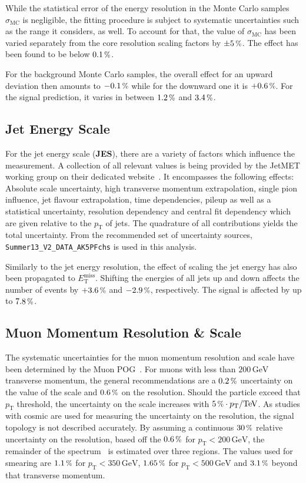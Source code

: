 While the statistical error of the energy resolution in the Monte Carlo samples $\sigma_{\text{MC}}$ is negligible, the fitting procedure is subject to systematic uncertainties such as the range it considers, as well. To account for that, the value of $\sigma_{\text{MC}}$ has been varied separately from the core resolution scaling factors by $\pm 5\,\pct$. The effect has been found to be below $0.1\,\pct$.

For the background Monte Carlo samples, the overall effect for an upward deviation then amounts to $-0.1\,\pct$ while for the downward one it is $+0.6\,\pct$. For the signal prediction, it varies in between $1.2\,\pct$ and $3.4\,\pct$.


\subsection{Jet Energy Scale}
\label{sec:jes}

For the jet energy scale (\textbf{JES}), there are a variety of factors which influence the measurement. A collection of all relevant values is being provided by the JetMET working group on their dedicated website~\cite{jes}. It encompasses the following effects: Absolute scale uncertainty, high transverse momentum extrapolation, single pion influence, jet flavour extrapolation, time dependencies, pileup as well as a statistical uncertainty, resolution dependency and central fit dependency which are given relative to the $p_{\text{T}}$ of jets. The quadrature of all contributions yields the total uncertainty. From the recommended set of uncertainty sources, \verb+Summer13_V2_DATA_AK5PFchs+ is used in this analysis. 

Similarly to the jet energy resolution, the effect of scaling the jet energy has also been propagated to $E_{\text{T}}^{\text{miss}}$. Shifting the energies of all jets up and down affects the number of events by $+3.6\,\pct$ and $-2.9\,\pct$, respectively. The signal is affected by up to $7.8\,\pct$.


\subsection{Muon Momentum Resolution \& Scale}
\label{sec:mers}

The systematic uncertainties for the muon momentum resolution and scale have been determined by the Muon POG~\cite{muonid2}. For muons with less than $200\,\text{GeV}$ transverse momentum, the general recommendations are a $0.2\,\pct$ uncertainty on the value of the scale and $0.6\,\pct$ on the resolution. Should the particle exceed that $p_{\text{T}}$ threshold, the uncertainty on the scale increases with $5\,\pct \cdot p_{\text{T}}/\text{TeV}$. As studies with cosmic are used for measuring the uncertainty on the resolution, the signal topology is not described accurately. By assuming a continuous $30\,\pct$ relative uncertainty on the resolution, based off the $0.6\,\pct$ for $p_{\text{T}} < 200\,\text{GeV}$, the remainder of the spectrum~\cite{muonptscale} is estimated over three regions. The values used for smearing are $1.1\,\pct$ for $p_{\text{T}} < 350\,\text{GeV}$, $1.65\,\pct$ for $p_{\text{T}} < 500\,\text{GeV}$ and $3.1\,\pct$ beyond that transverse momentum.

